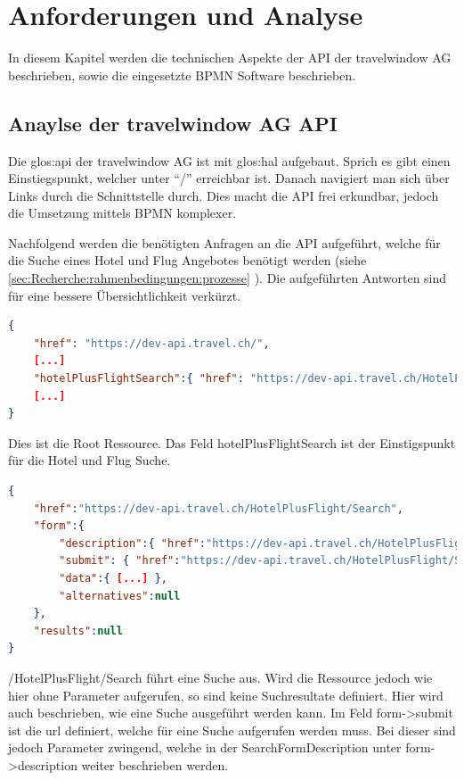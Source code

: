 

\chapter{Anforderungen und Analyse}
\label{sec:analyse}
In diesem Kapitel werden die technischen Aspekte der API der travelwindow AG beschrieben, sowie die eingesetzte BPMN Software beschrieben.

\section{Anaylse der travelwindow AG API}
\label{sec:analyse:api}
Die \Gls{glos:api} der travelwindow AG ist mit \Gls{glos:hal} aufgebaut. Sprich es gibt einen Einstiegspunkt, welcher unter "`/"' erreichbar ist. Danach navigiert man sich über Links durch die Schnittstelle durch. Dies macht die API frei erkundbar, jedoch die Umsetzung mittels BPMN komplexer.

Nachfolgend werden die benötigten Anfragen an die API aufgeführt, welche für die Suche eines Hotel und Flug Angebotes benötigt werden (siehe \cref{sec:Recherche:rahmenbedingungen:prozesse} ). Die aufgeführten Antworten sind für eine bessere Übersichtlichkeit verkürzt.


\begin{lstlisting}[language=json,firstnumber=1]
{
	"href": "https://dev-api.travel.ch/",
	[...]
	"hotelPlusFlightSearch":{ "href": "https://dev-api.travel.ch/HotelPlusFlight/Search" },
	[...]
}
\end{lstlisting}
Dies ist die Root Ressource. Das Feld hotelPlusFlightSearch ist der Einstigspunkt für die Hotel und Flug Suche.

\begin{lstlisting}[language=json,firstnumber=1]
{
    "href":"https://dev-api.travel.ch/HotelPlusFlight/Search",
    "form":{
        "description":{ "href":"https://dev-api.travel.ch/HotelPlusFlight/SearchFormDescription/HotelPlusFlight" },
        "submit": { "href":"https://dev-api.travel.ch/HotelPlusFlight/Search{?destination,periodOfStay,roomOccupancies*,departureAirport,departureAirports*,targetPeriodOfStay,hotelCategories*,ratings,mealTypeCategories*,directFlight,flightClasses*,matchHotels,productType}" },
        "data":{ [...] },
        "alternatives":null
    },
    "results":null
}
\end{lstlisting}
/HotelPlusFlight/Search führt eine Suche aus. Wird die Ressource jedoch wie hier ohne Parameter aufgerufen, so sind keine Suchresultate definiert.
Hier wird auch beschrieben, wie eine Suche ausgeführt werden kann. Im Feld form->submit ist die \gls{url} definiert, welche für eine Suche aufgerufen werden muss. Bei dieser sind jedoch Parameter zwingend, welche in der SearchFormDescription unter form->description weiter beschrieben werden.

